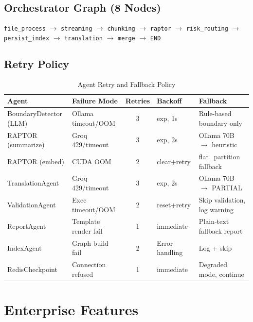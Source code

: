 \documentclass[11pt,a4paper]{article}
\begin{document}
\subsection{Orchestrator Graph (8 Nodes)}

\begin{infobox}
\small
\texttt{file\_process} $\longrightarrow$
\texttt{streaming} $\longrightarrow$
\texttt{chunking} $\longrightarrow$
\texttt{raptor} $\longrightarrow$
\texttt{risk\_routing} $\longrightarrow$
\texttt{persist\_index} $\longrightarrow$
\texttt{translation} $\longrightarrow$
\texttt{merge} $\longrightarrow$
\texttt{END}
\end{infobox}

\subsection{Retry Policy}

\begin{table}[H]
\centering
\caption{Agent Retry and Fallback Policy}
\renewcommand{\arraystretch}{1.25}
\small
\begin{tabularx}{\textwidth}{@{} l L{2.5cm} c l L{3.5cm} @{}}
\toprule
\textbf{Agent} & \textbf{Failure Mode} & \textbf{Retries} & \textbf{Backoff} & \textbf{Fallback} \\
\midrule
BoundaryDetector (LLM) & Ollama timeout/OOM & 3 & exp, 1s & Rule-based boundary only \\
RAPTOR (summarize) & Groq 429/timeout & 3 & exp, 2s & Ollama 70B $\to$ heuristic \\
RAPTOR (embed) & CUDA OOM & 2 & clear+retry & flat\_partition fallback \\
TranslationAgent & Groq 429/timeout & 3 & exp, 2s & Ollama 70B $\to$ PARTIAL \\
ValidationAgent & Exec timeout/OOM & 2 & reset+retry & Skip validation, log warning \\
ReportAgent & Template render fail & 1 & immediate & Plain-text fallback report \\
IndexAgent & Graph build fail & 2 & Error handling & Log + skip \\
RedisCheckpoint & Connection refused & 1 & immediate & Degraded mode, continue \\
\bottomrule
\end{tabularx}
\end{table}


\section{Enterprise Features}
\end{document}
